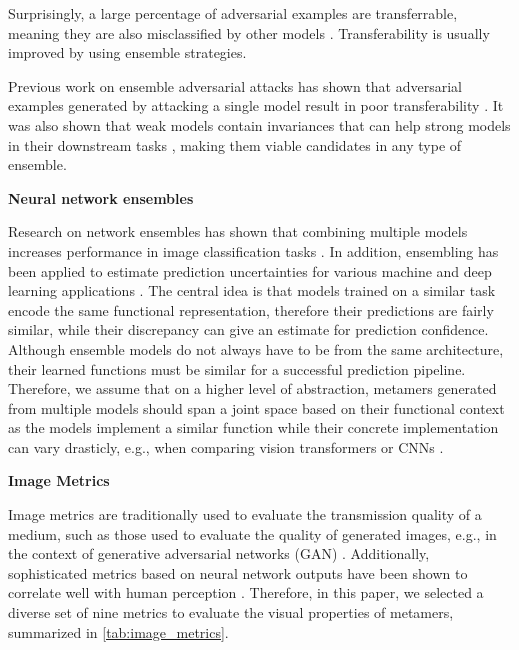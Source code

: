 \documentclass[pdflatex,sn-mathphys-num]{sn-jnl}%
\newcommand{\mmhead}[1]{\vspace{0.5cm}\noindent\textbf{#1}\vspace{0.3cm}}
\theoremstyle{thmstyleone}%
\theoremstyle{thmstyletwo}%
\theoremstyle{thmstylethree}%
\begin{document}
Surprisingly, a large percentage of adversarial examples are transferrable,
meaning they are also misclassified by other models \cite{szegedy_intriguing_2014}.
Transferability is usually improved by using ensemble strategies. %

Previous work on ensemble adversarial attacks has shown that adversarial examples generated by attacking a single model result in poor transferability \cite{chen_adaptive_2023}.
It was also shown that weak models contain invariances that can help strong models in their downstream tasks \cite{chen_explore_2023}, making them viable candidates in any type of ensemble.

\mmhead{Neural network ensembles} 

Research on network ensembles has shown that combining multiple models increases performance in image classification tasks \cite{shen_meal_2019}.
In addition, ensembling has been applied to estimate prediction uncertainties for various machine and deep learning applications \cite{beluch2018power, rigatti2017random}.
The central idea is that models trained on a similar task encode the same functional representation, therefore their predictions are fairly similar, while their discrepancy can give an estimate for prediction confidence.
Although ensemble models do not always have to be from the same architecture, their learned functions must be similar for a successful prediction pipeline.
Therefore, we assume that on a higher level of abstraction, metamers generated from multiple models should span a joint space based on their functional context as the models implement a similar function while their concrete implementation can vary drasticly, e.g., when comparing vision transformers or CNNs \cite{raghu2021vision}.





\mmhead{Image Metrics} 

Image metrics are traditionally used to evaluate the transmission quality of a medium, such as those used to evaluate the quality of generated images, e.g., in the context of generative adversarial networks (GAN) \cite{wang_image_2004,goodfellow_generative_2014}.
Additionally, sophisticated metrics based on neural network outputs have been shown to correlate well with human perception \cite{zhang_unreasonable_2018}.
Therefore, in this paper, we selected a diverse set of nine metrics to evaluate the visual properties of metamers, summarized in \cref{tab:image_metrics}.
\end{document}
